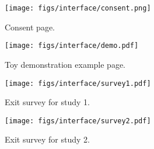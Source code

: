 \begin{figure}[ht]
    \centering
    \texttt{[image: figs/interface/consent.png]}
    \caption{Consent page.}
    \label{fig:consent-form}
\end{figure}

\begin{figure}[ht]
    \centering
    \texttt{[image: figs/interface/demo.pdf]}
    \caption{Toy demonstration example page.}
    \label{fig:demo}
\end{figure}


\begin{figure}
    \centering
    \texttt{[image: figs/interface/survey1.pdf]}
    \caption{Exit survey for study 1.}
    \label{fig:exit-survey-1}
\end{figure}

\begin{figure}
    \centering
    \texttt{[image: figs/interface/survey2.pdf]}
    \caption{Exit survey for study 2.}
    \label{fig:exit-survey-2}
\end{figure}